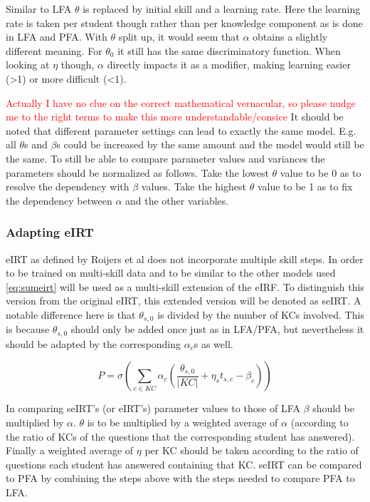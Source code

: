 \documentclass{article}
\newcommand\todo[1]{\textcolor{red}{#1}}
\begin{document}
Similar to LFA $\theta$ is replaced by initial skill and a learning rate. Here the learning rate is taken per student though rather than per knowledge component as is done in LFA and PFA. With $\theta$ split up, it would seem that $\alpha$ obtains a slightly different meaning. For $\theta_{0}$ it still has the same discriminatory function. When looking at $\eta$ though, $\alpha$ directly impacts it as a modifier, making learning easier (>1) or more difficult (<1).

\todo{Actually I have no clue on the correct mathematical vernacular, so please nudge me to the right terms to make this more understandable/consice}
It should be noted that different parameter settings can lead to exactly the same model. E.g. all $\theta$s and $\beta$s could be increased by the same amount and the model would still be the same. To still be able to compare parameter values and variances the parameters should be normalized as follows. Take the lowest $\theta$ value to be 0 as to resolve the dependency with $\beta$ values. Take the highest $\theta$ value to be 1 as to fix the dependency between $\alpha$ and the other variables.

\subsubsection{Adapting eIRT}
eIRT as defined by Roijers et al does not incorporate multiple skill steps. In order to be trained on multi-skill data and to be similar to the other models used \ref{eq:sumeirt} will be used as a multi-skill extension of the eIRF. To distinguish this version from the original eIRT, this extended version will be denoted as seIRT. A notable difference here is that $\theta_{s,0}$ is divided by the number of KCs involved. This is because $\theta_{s,0}$ should only be added once just as in LFA/PFA, but nevertheless it should be adapted by the corresponding $\alpha_{c}$s as well.

\begin{equation}
\label{eq:sumeirt}
P = \sigma(\sum_{c \in KC} \alpha_{c}(\frac{\theta_{s,0}}{|KC|} + \eta_{s} t_{s,c} - \beta_{c}))
\end{equation}

In comparing seIRT's (or eIRT's) parameter values to those of LFA $\beta$ should be multiplied by $\alpha$. $\theta$ is to be multiplied by a weighted average of $\alpha$ (according to the ratio of KCs of the questions that the corresponding student has answered). Finally a weighted average of $\eta$ per KC should be taken according to the ratio of questions each student has answered containing that KC. seIRT can be compared to PFA by combining the steps above with the steps needed to compare PFA to LFA.
\end{document}
